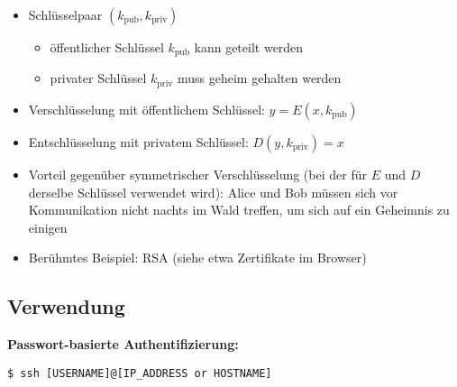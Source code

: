 \begin{itemize}
	\item Schlüsselpaar $(k_\text{pub}, k_\text{priv})$
	      \begin{itemize}
		      \item öffentlicher Schlüssel $k_\text{pub}$ kann geteilt werden
		      \item privater Schlüssel $k_\text{priv}$ muss geheim gehalten werden
	      \end{itemize}
	\item Verschlüsselung mit öffentlichem Schlüssel: $y = E(x, k_\text{pub})$
	\item Entschlüsselung mit privatem Schlüssel: $D(y, k_\text{priv}) = x$
	\item Vorteil gegenüber symmetrischer Verschlüsselung (bei der für $E$ und $D$ derselbe Schlüssel verwendet wird): Alice und Bob müssen sich vor Kommunikation nicht nachts im Wald treffen, um sich auf ein Geheimnis zu einigen
	\item Berühmtes Beispiel: RSA (siehe etwa Zertifikate im Browser)
\end{itemize}
%
%
\subsection{Verwendung}
\textbf{Passwort-basierte Authentifizierung:}
\begin{verbatim}
$ ssh [USERNAME]@[IP_ADDRESS or HOSTNAME]
\end{verbatim}

